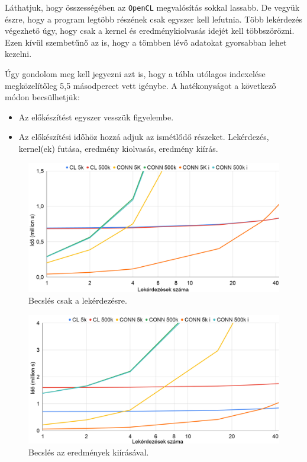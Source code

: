 Láthatjuk, hogy összességében az \texttt{OpenCL} megvalósítás sokkal lassabb. De vegyük észre, hogy a program legtöbb részének csak egyszer kell lefutnia. 
Több lekérdezés végezhető úgy, hogy csak a  kernel és eredménykiolvasás idejét kell többszörözni. Ezen kívül szembetűnő az is, hogy a tömbben lévő adatokat gyorsabban lehet kezelni.

Úgy gondolom meg kell jegyezni azt is, hogy a tábla utólagos indexelése megközelítőleg 5,5 másodpercet vett igénybe.
\newline A hatékonyságot a következő módon becsülhetjük:
\begin{itemize}
\item Az előkészítést egyszer vesszük figyelembe.
\item Az előkészítési időhöz hozzá adjuk az ismétlődő részeket.
Lekérdezés, kernel(ek) futása, eredmény kiolvasás, eredmény kiírás.
\end{itemize}

\begin{figure}[h!]
\centering
\includegraphics[width=\textwidth]{images/test/where3.png}
\caption{Becslés csak a lekérdezésre.}
\label{fig:where}
\end{figure}

\begin{figure}[h!]
\centering
\includegraphics[width=\textwidth]{images/test/where_write3.png}
\caption{Becslés az eredmények kiírásával.}
\label{fig:where_write}
\end{figure}

